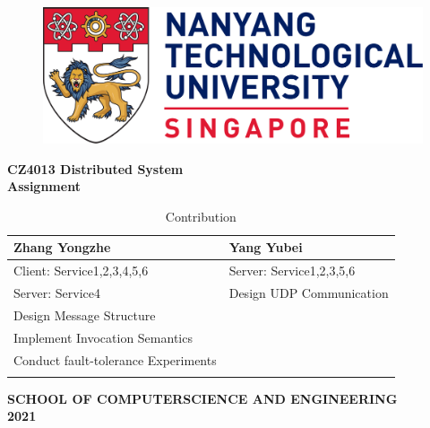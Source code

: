\begin{titlepage}

\begin{figure}[h!]
\centering
\includegraphics[width=1\textwidth]{Title/NTU_logo.png}
\caption*{}
\label{fig:entropy} 
\end{figure}

\vspace{1.5in}

\centering
\Huge{\textbf{CZ4013 Distributed System\\Assignment}}\\[1.5in]

\footnotesize
\begin{longtable}{|l|l|}
\hline
Zhang Yongzhe                       & Yang Yubei               \\ \hline
\endhead
%
Client: Service1,2,3,4,5,6          & Server: Service1,2,3,5,6 \\ \hline
Server: Service4                    & Design UDP Communication \\ \hline
Design Message Structure            &                          \\ \hline
Implement Invocation Semantics      &                          \\ \hline
Conduct fault-tolerance Experiments &                          \\ \hline
\caption{Contribution}
\end{longtable}

\normalsize{\textbf{SCHOOL OF COMPUTERSCIENCE AND ENGINEERING}}\\[0.2in]


\large{\textbf{2021}}
\end{titlepage}
\newpage